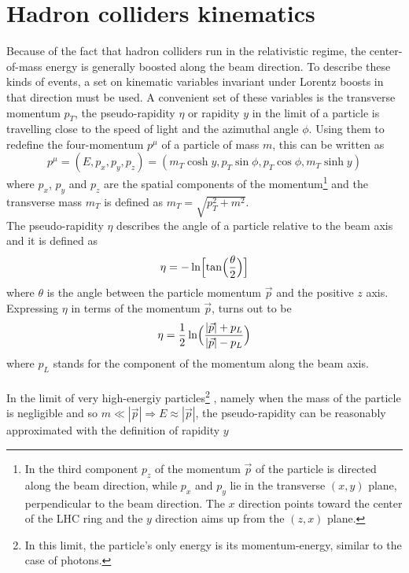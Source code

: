 \section{Hadron colliders kinematics}
Because of the fact that hadron colliders run in the relativistic regime, the center-of-mass energy is generally boosted along the beam direction. To describe these kinds of events, a set on kinematic variables invariant under Lorentz boosts in that direction must be used.
A convenient set of these variables is the transverse momentum $p_T$, the  pseudo-rapidity $\eta$ or rapidity $y$ in the limit of a particle is travelling close to the speed of light and the azimuthal angle $\phi$. Using them to redefine the four-momentum $p^{\mu}$ of a particle of mass $m$, this can be written as
\begin{equation}
p^{\mu} = (E, p_x, p_y, p_z) = (m_T\cosh y, p_T\sin\phi, p_T\cos\phi, m_T\sinh y)
\end{equation}
where $p_x$, $p_y$ and $p_z$ are the spatial components of the momentum\footnote{In the third component $p_z$ of the momentum $\vec{p}$ of the particle is directed along the beam direction, while $p_x$ and $p_y$ lie in the transverse $(x,y)$ plane, perpendicular to the beam direction. The $x$ direction points toward the center of the LHC ring and the $y$ direction aims up from the $(z,x)$ plane.}
and the transverse mass $m_T$ is defined as $m_T = \sqrt{p_T^2 + m^2}$.
\\
The pseudo-rapidity $\eta$ describes the angle of a particle relative to the beam axis and it is defined as
\begin{equation}
\eta = -\ln\Bigl[\tan\Bigl(\frac{\theta}{2}\Bigr)\Bigr]
\end{equation}
where $\theta$ is the angle between the particle momentum $\vec{p}$ and the positive $z$ axis. Expressing $\eta$ in terms of the momentum $\vec{p}$, turns out to be
\begin{equation}
\eta = \frac{1}{2}\ln\Bigl(\frac{|\vec{p}| + p_L}{|\vec{p}| - p_L}\Bigr)
\end{equation}
where $p_L$ stands for the component of the momentum along the beam axis.
\\\\
In the limit of very high-energiy particles\footnote{In this limit, the particle's only energy is its momentum-energy, similar to the case of photons.}
, namely when the mass of the particle is negligible and so $m \ll |\vec{p}| \Rightarrow E \approx |\vec{p}|$, the pseudo-rapidity can be reasonably approximated with the definition of rapidity $y$
